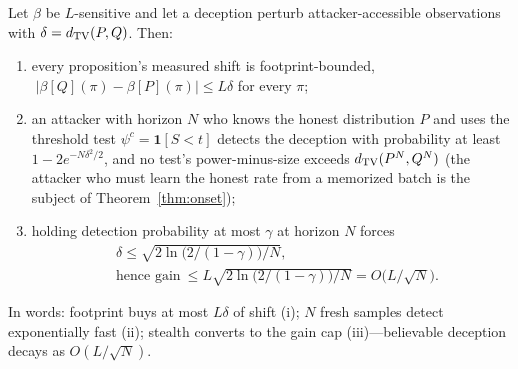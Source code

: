 \begin{theorem}\label{thm:patch}
Let $\beta$ be $L$-sensitive and let a deception perturb attacker-accessible
observations with $\delta=d_{\mathrm{TV}}(P,Q)$. Then:
\begin{enumerate}[label=(\roman*),leftmargin=2em]
\item every proposition's measured shift is footprint-bounded,
      $\;|\beta[Q](\pi)-\beta[P](\pi)|\le L\delta$ for every $\pi$;
\item an attacker with horizon $N$ who knows the honest distribution $P$ and
      uses the threshold test $\psi^{c}=\mathbf{1}[S<t]$ detects the
      deception with probability at least $1-2e^{-N\delta^{2}/2}$, and no
      test's power-minus-size exceeds $d_{\mathrm{TV}}(P^{N},Q^{N})$ (the attacker who
      must learn the honest rate from a memorized batch is the subject of
      Theorem~\ref{thm:onset});
\item holding detection probability at most $\gamma$ at horizon $N$ forces
      \[
      \begin{aligned}
      &\delta\le\sqrt{2\ln\bigl(2/(1-\gamma)\bigr)/N},\\
      &\text{hence gain}\ \le L\sqrt{2\ln\bigl(2/(1-\gamma)\bigr)/N}
      =O\bigl(L/\sqrt N\bigr).
      \end{aligned}
      \]
\end{enumerate}
\end{theorem}

In words: footprint buys at most $L\delta$ of shift (i); $N$ fresh samples
detect exponentially fast (ii); stealth converts to the gain cap
(iii)---believable deception decays as $O(L/\sqrt{N})$.

